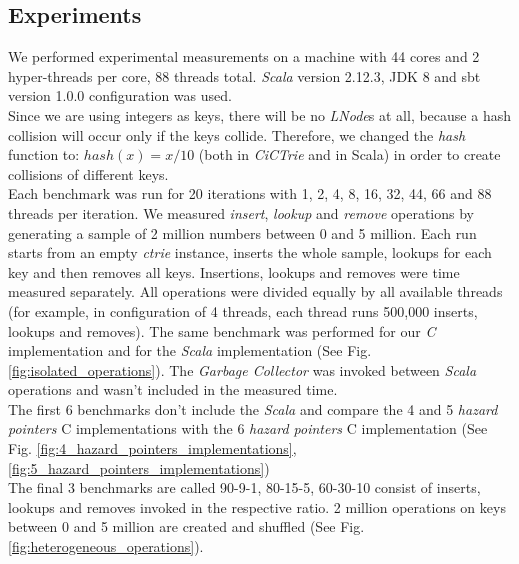 \documentclass[conference]{IEEEtran}
\begin{document}
\subsection{Experiments}
	We performed experimental measurements on a machine with 44 cores and 2 hyper-threads per core, 88 threads total. \textit{Scala} version 2.12.3, JDK 8 and sbt version 1.0.0 configuration was used. \\
	Since we are using integers as keys, there will be no \textit{LNode}s at all, because a hash collision will occur only if the keys collide. Therefore, we changed the \textit{hash} function to: $hash(x) = x / 10$ (both in \textit{CiCTrie} and in Scala) in order to create collisions of different keys. \\
	Each benchmark was run for 20 iterations with 1, 2, 4, 8, 16, 32, 44, 66 and 88 threads per iteration. We measured \textit{insert}, \textit{lookup} and \textit{remove} operations by generating a sample of 2 million numbers between 0 and 5 million. Each run starts from an empty \textit{ctrie} instance, inserts the whole sample, lookups for each key and then removes all keys. Insertions, lookups and removes were time measured separately. All operations were divided equally by all available threads (for example, in configuration of 4 threads, each thread runs 500,000 inserts, lookups and removes). The same benchmark was performed for our \textit{C} implementation and for the \textit{Scala} implementation (See Fig. \ref{fig:isolated_operations}). The \textit{Garbage Collector} was invoked between \textit{Scala} operations and wasn't included in the measured time. \\
	The first 6 benchmarks don't include the \textit{Scala} and compare the 4 and 5 \textit{hazard pointers} C implementations with the 6 \textit{hazard pointers} C implementation (See Fig. \ref{fig:4_hazard_pointers_implementations}, \ref{fig:5_hazard_pointers_implementations}) \\
	The final 3 benchmarks are called 90-9-1, 80-15-5, 60-30-10 consist of inserts, lookups and removes invoked in the respective ratio. 2 million operations on keys between 0 and 5 million are created and shuffled (See Fig. \ref{fig:heterogeneous_operations}).
\end{document}
